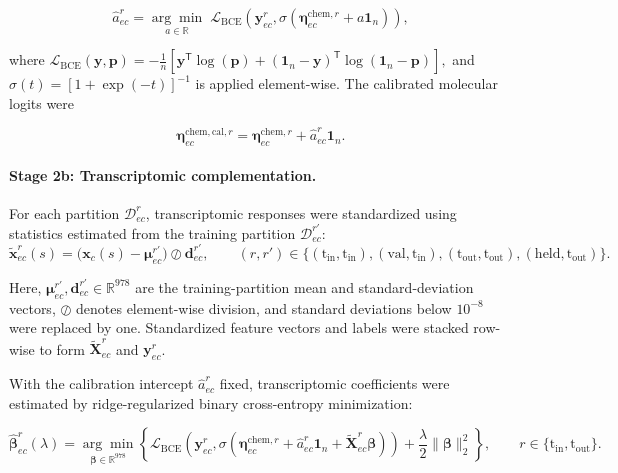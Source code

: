 \documentclass[11pt,a4paper]{article}
\begin{document}
\begin{equation}
\widehat a_{ec}^{r}
=
\underset{a\in\mathbb R}{\arg\min}\;
\mathcal L_{\mathrm{BCE}}
\!\left(
\mathbf y_{ec}^{r},
\sigma\!\left(
\boldsymbol\eta_{ec}^{\mathrm{chem},r}
+
a\mathbf 1_n
\right)
\right),
\label{eq:calibration-intercept}
\end{equation}

where
\(
\mathcal L_{\mathrm{BCE}}(\mathbf y,\mathbf p)
=
-\frac{1}{n}
\left[
\mathbf y^{\mathsf T}\log(\mathbf p)
+
(\mathbf 1_n-\mathbf y)^{\mathsf T}
\log(\mathbf 1_n-\mathbf p)
\right],
\)
and $\sigma(t)=[1+\exp(-t)]^{-1}$ is applied element-wise. The calibrated
molecular logits were

\begin{equation}
\boldsymbol\eta_{ec}^{\mathrm{chem,cal},r}
=
\boldsymbol\eta_{ec}^{\mathrm{chem},r}
+
\widehat a_{ec}^{r}\mathbf 1_n.
\label{eq:calibrated-molecular-logit}
\end{equation}

\paragraph{Stage 2b: Transcriptomic complementation.}

For each partition $\mathcal D_{ec}^{r}$, transcriptomic responses were
standardized using statistics estimated from the training
partition $\mathcal D_{ec}^{r'}$:
\begin{equation}
\widetilde{\mathbf x}_{ec}^{r}(s)
=
\bigl(
\mathbf x_c(s)-\boldsymbol\mu_{ec}^{r'}
\bigr)
\oslash
\mathbf d_{ec}^{r'},
\qquad
(r,r')
\in
\{
(\mathrm{t_{in}},\mathrm{t_{in}}),
(\mathrm{val},\mathrm{t_{in}}),
(\mathrm{t_{out}},\mathrm{t_{out}}),
(\mathrm{held},\mathrm{t_{out}})
\}.
\label{eq:standardization}
\end{equation}

Here,
$\boldsymbol\mu_{ec}^{r'},\mathbf d_{ec}^{r'}\in\mathbb R^{978}$
are the training-partition mean and standard-deviation vectors,
$\oslash$ denotes element-wise division, and standard deviations below
$10^{-8}$ were replaced by one. Standardized feature vectors and labels
were stacked row-wise to form $\widetilde{\mathbf X}_{ec}^{r}$ and
$\mathbf y_{ec}^{r}$.

With the calibration intercept $\widehat a_{ec}^{r}$ fixed,
transcriptomic coefficients were estimated by ridge-regularized binary
cross-entropy minimization:

\begin{equation}
\widehat{\boldsymbol\beta}_{ec}^{r}(\lambda)
=
\underset{\boldsymbol\beta\in\mathbb R^{978}}{\arg\min}
\left\{
\mathcal L_{\mathrm{BCE}}
\!\left(
\mathbf y_{ec}^{r},
\sigma\!\left(
\boldsymbol\eta^{\mathrm{chem},r}_{ec}
+\widehat a_{ec}^{r}\mathbf 1_n
+\widetilde{\mathbf X}^{r}_{ec}\boldsymbol\beta
\right)
\right)
+
\frac{\lambda}{2}
\|\boldsymbol\beta\|_2^2
\right\},
\qquad
r\in\{\mathrm{t_{in}},\mathrm{t_{out}}\}.
\label{eq:residual-objective}
\end{equation}
\end{document}
